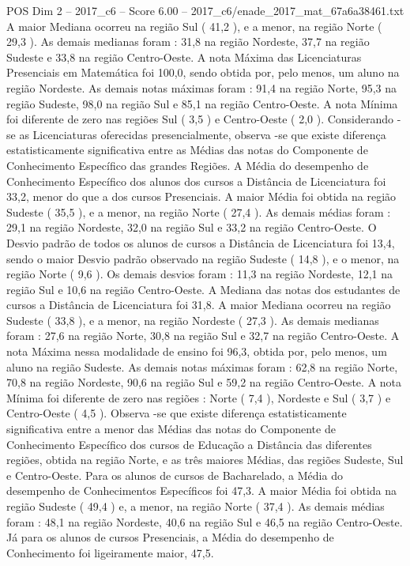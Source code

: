 \begin{textsample}{POS Dim 2 – 2017\_c6 – Score 6.00 – 2017\_c6/enade\_2017\_mat\_67a6a38461.txt}
A maior Mediana ocorreu na região Sul ( 41,2 ), e a menor, na região Norte ( 29,3 ).
As demais medianas foram : 31,8 na região Nordeste, 37,7 na região Sudeste e 33,8 na região Centro-Oeste.
A nota Máxima das Licenciaturas Presenciais em Matemática foi 100,0, sendo obtida por, pelo menos, um aluno na região Nordeste.
As demais notas máximas foram : 91,4 na região Norte, 95,3 na região Sudeste, 98,0 na região Sul e 85,1 na região Centro-Oeste.
A nota Mínima foi diferente de zero nas regiões Sul ( 3,5 ) e Centro-Oeste ( 2,0 ).
Considerando -se as Licenciaturas oferecidas presencialmente, observa -se que existe diferença estatisticamente significativa entre as Médias das notas do Componente de Conhecimento Específico das grandes Regiões.
A Média do desempenho de Conhecimento Específico dos alunos dos cursos a Distância de Licenciatura foi 33,2, menor do que a dos cursos Presenciais.
A maior Média foi obtida na região Sudeste ( 35,5 ), e a menor, na região Norte ( 27,4 ).
As demais médias foram : 29,1 na região Nordeste, 32,0 na região Sul e 33,2 na região Centro-Oeste.
O Desvio padrão de todos os alunos de cursos a Distância de Licenciatura foi 13,4, sendo o maior Desvio padrão observado na região Sudeste ( 14,8 ), e o menor, na região Norte ( 9,6 ).
Os demais desvios foram : 11,3 na região Nordeste, 12,1 na região Sul e 10,6 na região Centro-Oeste.
A Mediana das notas dos estudantes de cursos a Distância de Licenciatura foi 31,8.
A maior Mediana ocorreu na região Sudeste ( 33,8 ), e a menor, na região Nordeste ( 27,3 ).
As demais medianas foram : 27,6 na região Norte, 30,8 na região Sul e 32,7 na região Centro-Oeste.
A nota Máxima nessa modalidade de ensino foi 96,3, obtida por, pelo menos, um aluno na região Sudeste.
As demais notas máximas foram : 62,8 na região Norte, 70,8 na região Nordeste, 90,6 na região Sul e 59,2 na região Centro-Oeste.
A nota Mínima foi diferente de zero nas regiões : Norte ( 7,4 ), Nordeste e Sul ( 3,7 ) e Centro-Oeste ( 4,5 ).
Observa -se que existe diferença estatisticamente significativa entre a menor das Médias das notas do Componente de Conhecimento Específico dos cursos de Educação a Distância das diferentes regiões, obtida na região Norte, e as três maiores Médias, das regiões Sudeste, Sul e Centro-Oeste.
Para os alunos de cursos de Bacharelado, a Média do desempenho de Conhecimentos Específicos foi 47,3.
A maior Média foi obtida na região Sudeste ( 49,4 ) e, a menor, na região Norte ( 37,4 ).
As demais médias foram : 48,1 na região Nordeste, 40,6 na região Sul e 46,5 na região Centro-Oeste.
Já para os alunos de cursos Presenciais, a Média do desempenho de Conhecimento foi ligeiramente maior, 47,5.

\end{textsample}
